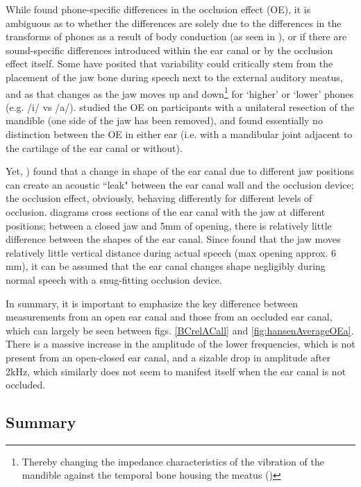 \documentclass[dissertation,copyright]{uathesis}
\begin{document}
While \cite{hansen:97b} found phone-specific differences in the occlusion effect (OE), it is ambiguous as to whether the differences are solely due to the differences in the transforms of phones as a result of body conduction (as seen in \cite{reinfeldt:10}), or if there are sound-specific differences introduced within the ear canal or by the occlusion effect itself.  
Some have posited that variability could critically stem from the placement of the jaw bone during speech next to the external auditory meatus, and as that changes as the jaw moves up and down\footnote{Thereby changing the impedance characteristics of the vibration of the mandible against the temporal bone housing the meatus (\cite{bekesy:60})} for `higher' or `lower' phones (e.g. /i/ vs /a/).  \cite{allen:60} studied the OE on participants with a unilateral resection of the mandible (one side of the jaw has been removed), and found essentially no distinction between the OE in either ear (i.e. with a mandibular joint adjacent to the cartilage of the ear canal or without).

Yet, \cite{hansen:97b}) found that a change in shape of the ear canal due to different jaw positions can create an acoustic ``leak" between the ear canal wall and the occlusion device; the occlusion effect, obviously, behaving differently for different levels of occlusion. 
\cite{hansen:97b} diagrams cross sections of the ear canal with the jaw at different positions; between a closed jaw and 5mm of opening, there is relatively little difference between the shapes of the ear canal.  Since \cite{borghese:97} found that the jaw moves relatively little vertical distance during actual speech (max opening approx. 6 mm), it can be assumed that the ear canal changes shape negligibly during normal speech with a snug-fitting occlusion device. 

In summary, it is important to emphasize the key difference between measurements from an open ear canal and those from an occluded ear canal, which can largely be seen between figs. \ref{BCrelACall} and \ref{fig:hansenAverageOEa}.  There is a massive increase in the amplitude of the lower frequencies, which is not present from an open-closed ear canal, and a sizable drop in amplitude after 2kHz, which similarly does not seem to manifest itself when the ear canal is not occluded.


\subsection{Summary}
\end{document}
